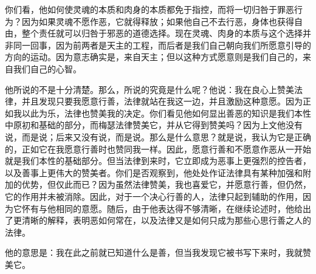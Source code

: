 \par

你们看，他如何使灵魂的本质和肉身的本质都免于指控，而将一切归咎于罪恶行为？因为如果灵魂不愿作恶，它就得释放；如果他自己不去行恶，身体也获得自由，整个责任就可以归咎于邪恶的道德选择。现在灵魂、肉身的本质与这个选择并非同一回事，因为前两者是天主的工程，而后者是我们自己朝向我们所愿意引导的方向的运动。因为意志确实是，来自天主；但以这种方式愿意则是我们自己的，来自我们自己的心智。\par

\par

他所说的不是十分清楚。那么，所说的究竟是什么呢？他说：我在良心上赞美法律，并且发现只要我愿意行善，法律就站在我这一边，并且激励这种意愿。因为正如我以此为乐，法律也赞美我的决定。你们看见他如何显出善恶的知识是我们本性中原初和基础的部分，而梅瑟法律赞美它，并从它得到赞美吗？因为上文他没有说，而是说；后来又没有说，而是说。那么是什么意思？就是说，我认为它是正确的，正如它在我愿意行善时也赞同我一样。因此，愿意行善和不愿意作恶从一开始就是我们本性的基础部分。但当法律到来时，它立即成为恶事上更强烈的控告者，以及善事上更伟大的赞美者。你们是否观察到，他处处作证法律具有某种加强和附加的优势，但仅此而已？因为虽然法律赞美，我也喜爱它，并愿意行善，但仍然，它的作用并未被消除。因此，对于一个决心行善的人，法律只起到辅助的作用，因为它怀有与他相同的意愿。随后，由于他表达得不够清晰，在继续论述时，他给出了更清晰的解释，表明恶如何常在，以及法律又是如何只成为那些心思行善之人的法律。\par

\par

他的意思是：我在此之前就已知道什么是善，但当我发现它被书写下来时，我就赞美它。\par

\par


